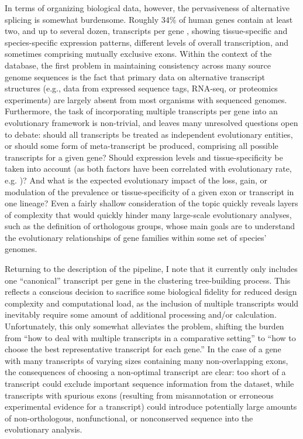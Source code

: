 In terms of organizing biological data, however, the pervasiveness of
alternative splicing is somewhat burdensome. Roughly 34\% of human
genes contain at least two, and up to several dozen, transcripts per
gene \citep{Mironov1999}, showing tissue-specific and species-specific
expression patterns, different levels of overall transcription, and
sometimes comprising mutually exclusive exons. Within the context of
the \cmp database, the first problem in maintaining consistency across
many source genome sequences is the fact that primary data on
alternative transcript structures (e.g., data from expressed sequence
tags, RNA-seq, or proteomics experiments) are largely absent from most
organisms with sequenced genomes. Furthermore, the task of
incorporating multiple transcripts per gene into an evolutionary
framework is non-trivial, and leaves many unresolved questions open to
debate: should all transcripts be treated as independent evolutionary
entities, or should some form of meta-transcript be produced,
comprising all possible transcripts for a given gene? Should
expression levels and tissue-specificity be taken into account (as
both factors have been correlated with evolutionary rate,
e.g. \citep{Koonin2006a,Zhu2008})? And what is the expected
evolutionary impact of the loss, gain, or modulation of the prevalence
or tissue-specificity of a given exon or transcript in one lineage?
Even a fairly shallow consideration of the topic quickly reveals
layers of complexity that would quickly hinder many large-scale
evolutionary analyses, such as the definition of orthologous groups,
whose main goals are to understand the evolutionary relationships of
gene families within some set of species' genomes.

Returning to the description of the \cmp pipeline, I note that it
currently only includes one ``canonical'' transcript per gene in the
clustering tree-building process. This reflects a conscious decision
to sacrifice some biological fidelity for reduced design complexity
and computational load, as the inclusion of multiple transcripts would
inevitably require some amount of additional processing and/or
calculation. Unfortunately, this only somewhat alleviates the problem,
shifting the burden from ``how to deal with multiple transcripts in a
comparative setting'' to ``how to choose the best representative
transcript for each gene.'' In the case of a gene with many
transcripts of varying sizes containing many non-overlapping exons,
the consequences of choosing a non-optimal transcript are clear: too
short of a transcript could exclude important sequence information
from the dataset, while transcripts with spurious exons (resulting
from misannotation or erroneous experimental evidence for a
transcript) could introduce potentially large amounts of
non-orthologous, nonfunctional, or nonconserved sequence into the
evolutionary analysis.

